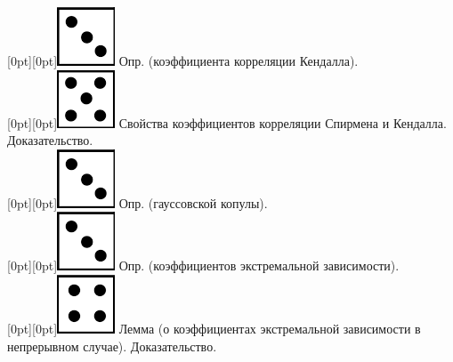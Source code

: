 \documentclass[10pt]{amsart}
\begin{document}
\begin{enumerate}
\begin{enumerate}
 \raisebox{-1pt}[0pt][0pt]{\includegraphics[width=0.02\linewidth]{3.png}} Опр. (коэффициента корреляции Кендалла). \\
 \raisebox{-1pt}[0pt][0pt]{\includegraphics[width=0.02\linewidth]{5.png}} Свойства коэффициентов корреляции Спирмена и Кендалла. Доказательство. \\ 
 \raisebox{-1pt}[0pt][0pt]{\includegraphics[width=0.02\linewidth]{3.png}} Опр. (гауссовской копулы). \\
 \raisebox{-1pt}[0pt][0pt]{\includegraphics[width=0.02\linewidth]{3.png}} Опр. (коэффициентов экстремальной зависимости). \\
 \raisebox{-1pt}[0pt][0pt]{\includegraphics[width=0.02\linewidth]{4.png}} Лемма (о коэффициентах экстремальной зависимости в непрерывном случае). Доказательство. \\
\end{enumerate}
    

\end{enumerate}
\end{document}
